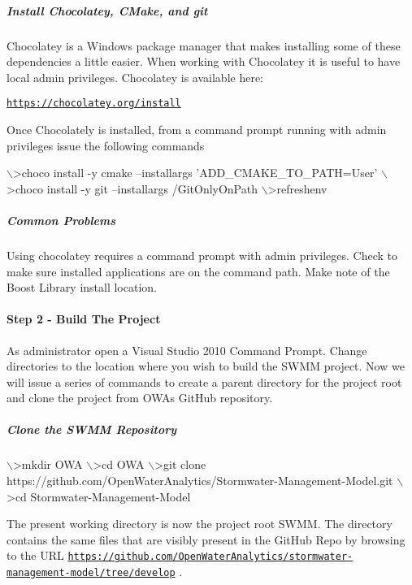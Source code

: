 \subparagraph*{Install Chocolatey, C\+Make, and git}

Chocolatey is a Windows package manager that makes installing some of these dependencies a little easier. When working with Chocolatey it is useful to have local admin privileges. Chocolatey is available here\+:

\href{https://chocolatey.org/install}{\tt https\+://chocolatey.\+org/install}

Once Chocolately is installed, from a command prompt running with admin privileges issue the following commands


\begin{DoxyCode}
\(\backslash\)>choco install -y cmake --installargs 'ADD\_CMAKE\_TO\_PATH=User'
\(\backslash\)>choco install -y git --installargs /GitOnlyOnPath
\(\backslash\)>refreshenv
\end{DoxyCode}


\subparagraph*{Common Problems}

Using chocolatey requires a command prompt with admin privileges. Check to make sure installed applications are on the command path. Make note of the Boost Library install location.

\paragraph*{Step 2 -\/ Build The Project}

As administrator open a Visual Studio 2010 Command Prompt. Change directories to the location where you wish to build the S\+W\+MM project. Now we will issue a series of commands to create a parent directory for the project root and clone the project from O\+WA\textquotesingle{}s Git\+Hub repository.

\subparagraph*{Clone the S\+W\+MM Repository}


\begin{DoxyCode}
\(\backslash\)>mkdir OWA
\(\backslash\)>cd OWA
\(\backslash\)>git clone https://github.com/OpenWaterAnalytics/Stormwater-Management-Model.git
\(\backslash\)>cd Stormwater-Management-Model
\end{DoxyCode}


The present working directory is now the project root S\+W\+MM. The directory contains the same files that are visibly present in the Git\+Hub Repo by browsing to the U\+RL \href{https://github.com/OpenWaterAnalytics/stormwater-management-model/tree/develop}{\tt https\+://github.\+com/\+Open\+Water\+Analytics/stormwater-\/management-\/model/tree/develop} .


